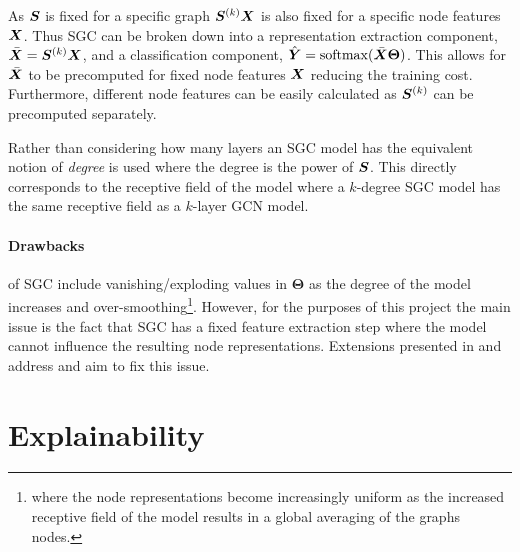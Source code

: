As ${\bm{S}}$ is fixed for a specific graph ${\bm{S}}^{(k)}{\bm{X}}$ is also fixed for a specific node features ${\bm{X}}$.
Thus SGC can be broken down into a representation extraction component, $\bar{{\bm{X}}} = {\bm{S}}^{(k)}{\bm{X}}$, and a classification component, $\hat{{\bm{Y}}} = \operatorname{softmax}(\bar{{\bm{X}}}\bm{\Theta})$.
This allows for $\bar{{\bm{X}}}$ to be precomputed for fixed node features ${\bm{X}}$ reducing the training cost.
Furthermore, different node features can be easily calculated as ${\bm{S}}^{(k)}$ can be precomputed separately.

Rather than considering how many layers an SGC model has the equivalent notion of \emph{degree} is used where the degree is the power of ${\bm{S}}$.
This directly corresponds to the receptive field of the model where a $k$-degree SGC model has the same receptive field as a $k$-layer GCN model.

\paragraph{Drawbacks}
of SGC include vanishing/exploding values in $\bm{\Theta}$ as the degree of the model increases and over-smoothing\footnote{where the node representations become increasingly uniform as the increased receptive field of the model results in a global averaging of the graphs nodes.}.
However, for the purposes of this project the main issue is the fact that SGC has a fixed feature extraction step where the model cannot influence the resulting node representations.
Extensions presented in  and  address and aim to fix this issue.




\section{Explainability}

